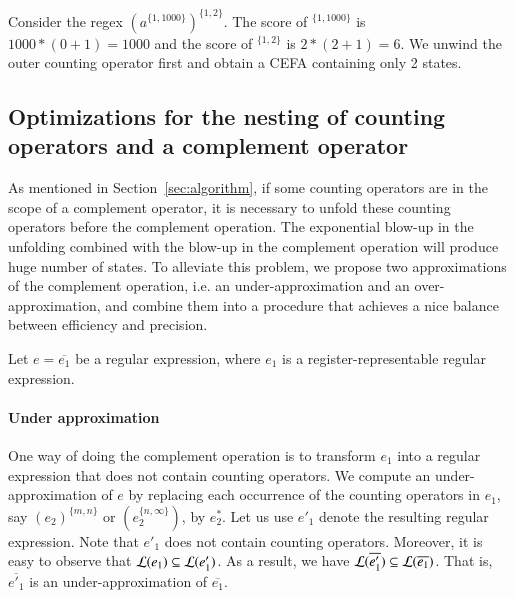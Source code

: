 {\begin{example}
  Consider the regex $(a^{\{1,1000\}})^{\{1,2\}}$. The score of $^{\{1,1000\}}$ is $1000*(0+1) = 1000$ and the score of $^{\{1,2\}}$ is $2*(2+1) = 6$. We unwind the outer counting operator first and obtain a CEFA containing only 2 states.  
\end{example}
}



\subsection{Optimizations for the nesting of counting operators and a complement operator}

As mentioned in Section~\ref{sec:algorithm}, if some counting operators are in the scope of a complement operator, it is necessary to unfold these counting operators before the complement operation. The exponential blow-up in the unfolding combined with the blow-up in the complement operation will produce huge number of states.  To alleviate this problem, we propose two approximations of the complement operation, i.e. an under-approximation and an over-approximation, and combine them into a procedure that achieves a nice balance between efficiency and precision. 

Let $e = \overline{e_1}$ be a regular expression, where $e_1$ is a register-representable regular expression. 

\paragraph*{Under approximation}
%
One way of doing the complement operation is to transform $e_1$ into a regular expression that does not contain counting operators. We compute an under-approximation of $e$ by replacing each occurrence of the counting operators in $e_1$, say $(e_2)^{\{m,n\}}$ or $(e_2^{\{n, \infty\}})$, by $e_2^*$. Let us use $e'_1$ denote the resulting regular expression. Note that $e'_1$ does not contain counting operators. Moreover, it is easy to observe that $\mathcal{L}(e_1) \subseteq \mathcal{L}(e'_1)$. As a result, we have $\mathcal{L}(\overline{e'_1}) \subseteq \mathcal{L}(\overline{e_1})$. That is, $\overline{e'_1}$ is an under-approximation of $\overline{e_1}$. 



